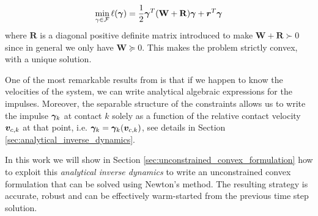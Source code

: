 \begin{eqnarray}
	\min_{\gamma\in \mathcal{F}} \ell(\bgamma) =
	\frac{1}{2}\bgamma^T(\mathbf{W}+\mathbf{R})\bgamma + {\bm r}^T
	\bgamma
	\label{eq:dual_regularized}
\end{eqnarray}
where $\mathbf{R}$ is a diagonal positive definite matrix introduced to
make $\mathbf{W}+\mathbf{R}\succ 0$ since in general we only have $\mathbf{W}
\succeq 0$. This makes the problem strictly convex, with a unique solution. 

One of the most remarkable results from \cite{bib:todorov2014} is that if we
 happen to know the velocities of the system, we can write analytical algebraic
 expressions for the impulses. Moreover, the separable structure of the
 constraints allows us to write the impulse ${\bm\gamma}_k$ at contact $k$ solely as
 a function of the relative contact velocity ${\bm{v}}_{c,k}$ at that point, i.e.
 ${\bm\gamma}_k = {\bm\gamma}_k({\bm{v}}_{c,k})$, see details in Section
 \ref{sec:analytical_inverse_dynamics}.

In this work we will show in Section \ref{sec:unconstrained_convex_formulation}
how to exploit this \textit{analytical inverse dynamics} to write an
unconstrained convex formulation that can be solved using Newton's method. The
resulting strategy is accurate, robust and can be effectively warm-started from
the previous time step solution.
